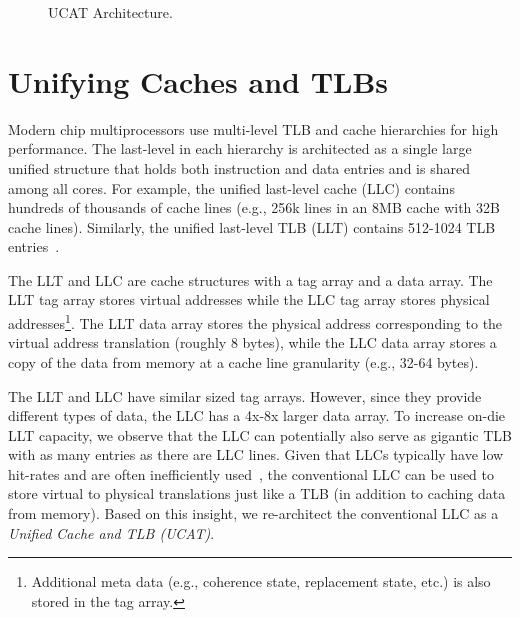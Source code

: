 \begin{figure*}[tbh] 
\vspace{-0. in}
\centering
\centerline{}
\caption{\small UCAT Architecture. \normalsize}
\label{fig:UCAT} 
\vspace{-0.0in}
\end{figure*}

\section{Unifying Caches and TLBs}
\label{sec:UCAT}

\noindent Modern chip multiprocessors use multi-level TLB and cache
hierarchies for high performance. The last-level in each hierarchy is
architected as a single large unified structure that holds both
instruction and data entries and is shared among all cores. For
example, the unified last-level cache (LLC) contains hundreds of
thousands of cache lines (e.g., 256k lines in an 8MB cache with 32B
cache lines). Similarly, the unified last-level TLB (LLT) contains
512-1024 TLB entries~\cite{sodani2016knights,ia_manual}.


The LLT and LLC are cache structures with a tag array and a data
array. The LLT tag array stores virtual addresses while the LLC tag
array stores physical addresses\footnote{Additional meta data (e.g.,
coherence state, replacement state, etc.) is also stored in the tag
array.}. The LLT data array stores the physical address corresponding
to the virtual address translation (roughly 8 bytes), while the LLC
data array stores a copy of the data from memory at a cache line
granularity (e.g., 32-64 bytes).



The LLT and LLC have similar sized tag arrays. However, since they
provide different types of data, the LLC has a 4x-8x larger data
array. To increase on-die LLT capacity, we observe that the LLC can
potentially also serve as gigantic TLB with as many entries as there
are LLC lines. Given that LLCs typically have low hit-rates and are
often inefficiently
used~\cite{jaleel_rrip,setdueling,wu2011,jimenez_micro2013,khan2010},
the conventional LLC can be used to store virtual to physical
translations just like a TLB (in addition to caching data from
memory). Based on this insight, we re-architect the conventional LLC
as a {\em Unified Cache and TLB (UCAT)}.

